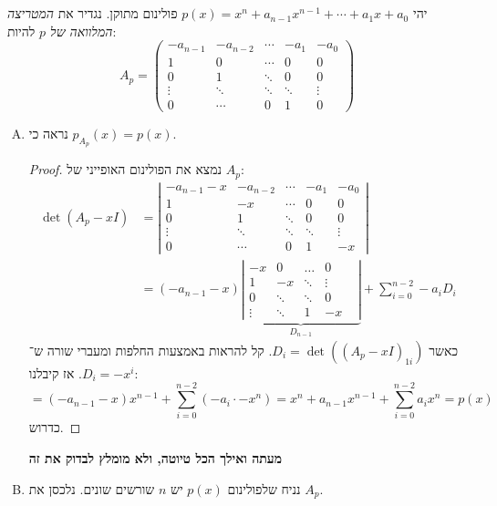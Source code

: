 \documentclass[]{article}
\newcommand\pms[1]    {\begin{pmatrix}
		#1
\end{pmatrix}}
\newcommand\detms[1]  {\left\vert\begin{matrix}
		#1
\end{matrix}\right\vert}
\theoremstyle{definition}
\begin{document}
	\section{}
	יהי $p(x) = x^{n} + a_{n - 1}x^{n - 1} + \cdots + a_1x + a_0$ פולינום מתוקן. נגדיר את \textit{המטריצה המלוואה של $p$} להיות: 
	\[ A_p = \pms{-a_{n - 1} & -a_{n - 2} & \cdots & -a_1 & -a_0 \\
		1 & 0 & \cdots & 0 & 0 \\
		0 & 1 & \ddots  & 0 & 0 \\
		\vdots & \ddots & \ddots & \ddots & \vdots \\ 0 & \cdots & 0 & 1 & 0} \]
	\begin{enumerate}[A)]
		\item נראה כי $p_{A_p}(x) = p(x)$. \begin{proof}
			נמצא את הפולינום האופייני של $A_p$: 
			\begin{align*}
				\det (A_p - xI) &= \detms{-a_{n - 1} -x & -a_{n - 2} & \cdots & -a_1 & -a_0 \\
					1 & -x & \cdots & 0 & 0 \\
					0 & 1 & \ddots  & 0 & 0 \\
					\vdots & \ddots & \ddots & \ddots & \vdots \\ 0 & \cdots & 0 & 1 & -x} \\
					&= (-a_{n - 1} - x)\underbrace{\detms{
						-x & 0 & \dots & 0 \\ 1 & -x & \ddots & \vdots & \\ 0 & \ddots & \ddots & 0 \\ \vdots & \ddots & 1 & -x
						}}_{D_{n - 1}} + \sum_{i = 0}^{n - 2}-a_{i}D_i
			\end{align*}
			כאשר $D_i = \det((A_p - xI)_{1i})$. קל להראות באמצעות החלפות ומעברי שורה ש־$D_i = -x^i$. אז קיבלנו: 
			\[ = (-a_{n - 1} - x)x^{n - 1} + \sum_{i = 0}^{n - 2}(-a_i \cdot -x^{n}) = x^{n} + a_{n - 1}x^{n - 1} + \sum_{i = 0}^{n - 2}a_i x^{n} = p(x) \]
			כדרוש. 
		\end{proof}
		
		\hfil \Large \textbf{מעתה ואילך הכל טיוטה, ולא מומלץ לבדוק את זה} \normalsize
		
		
		\item נניח שלפולינום $p(x)$ יש $n$ שורשים שונים. נלכסן את $A_p$. 
		

\end{enumerate}
\end{document}
